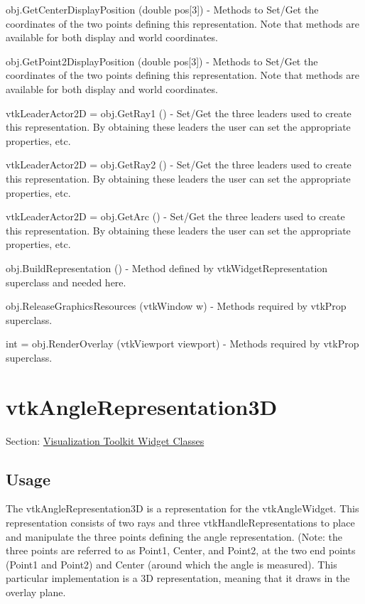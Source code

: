 \begin{DoxyItemize}
\item {\ttfamily obj.\-Get\-Center\-Display\-Position (double pos\mbox{[}3\mbox{]})} -\/ Methods to Set/\-Get the coordinates of the two points defining this representation. Note that methods are available for both display and world coordinates.  
\item {\ttfamily obj.\-Get\-Point2\-Display\-Position (double pos\mbox{[}3\mbox{]})} -\/ Methods to Set/\-Get the coordinates of the two points defining this representation. Note that methods are available for both display and world coordinates.  
\item {\ttfamily vtk\-Leader\-Actor2\-D = obj.\-Get\-Ray1 ()} -\/ Set/\-Get the three leaders used to create this representation. By obtaining these leaders the user can set the appropriate properties, etc.  
\item {\ttfamily vtk\-Leader\-Actor2\-D = obj.\-Get\-Ray2 ()} -\/ Set/\-Get the three leaders used to create this representation. By obtaining these leaders the user can set the appropriate properties, etc.  
\item {\ttfamily vtk\-Leader\-Actor2\-D = obj.\-Get\-Arc ()} -\/ Set/\-Get the three leaders used to create this representation. By obtaining these leaders the user can set the appropriate properties, etc.  
\item {\ttfamily obj.\-Build\-Representation ()} -\/ Method defined by vtk\-Widget\-Representation superclass and needed here.  
\item {\ttfamily obj.\-Release\-Graphics\-Resources (vtk\-Window w)} -\/ Methods required by vtk\-Prop superclass.  
\item {\ttfamily int = obj.\-Render\-Overlay (vtk\-Viewport viewport)} -\/ Methods required by vtk\-Prop superclass.  
\end{DoxyItemize}\hypertarget{vtkwidgets_vtkanglerepresentation3d}{}\section{vtk\-Angle\-Representation3\-D}\label{vtkwidgets_vtkanglerepresentation3d}
Section\-: \hyperlink{sec_vtkwidgets}{Visualization Toolkit Widget Classes} \hypertarget{vtkwidgets_vtkxyplotwidget_Usage}{}\subsection{Usage}\label{vtkwidgets_vtkxyplotwidget_Usage}
The vtk\-Angle\-Representation3\-D is a representation for the vtk\-Angle\-Widget. This representation consists of two rays and three vtk\-Handle\-Representations to place and manipulate the three points defining the angle representation. (Note\-: the three points are referred to as Point1, Center, and Point2, at the two end points (Point1 and Point2) and Center (around which the angle is measured). This particular implementation is a 3\-D representation, meaning that it draws in the overlay plane.

